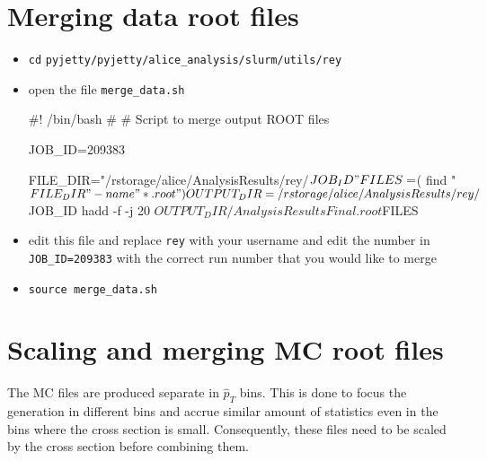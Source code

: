 \documentclass[12pt]{article}
\begin{document}
\section{Merging data root files}

\begin{itemize}
\item \verb|cd| \verb|pyjetty/pyjetty/alice_analysis/slurm/utils/rey|
\item open the file \verb|merge_data.sh|

\begin{tcolorbox}
\begin{verbnobox}[\scriptsize]
#! /bin/bash
#
# Script to merge output ROOT files

JOB_ID=209383

FILE_DIR="/rstorage/alice/AnalysisResults/rey/$JOB_ID"
FILES=$( find "$FILE_DIR" -name "*.root" )

OUTPUT_DIR=/rstorage/alice/AnalysisResults/rey/$JOB_ID
hadd -f -j 20 $OUTPUT_DIR/AnalysisResultsFinal.root $FILES
\end{verbnobox}  
\end{tcolorbox}

\item edit this file and replace \verb|rey| with your username and edit the number in \verb|JOB_ID=209383| with the correct run number that you would like to merge
\item \verb|source merge_data.sh|
\end{itemize}

\section{Scaling and merging MC root files}
\label{sec:scale_merge}

The MC files are produced separate in $\hat{p}_T$ bins. This is done to focus the generation in different bins
and accrue similar amount of statistics even in the bins where the cross section is small. Consequently, these files need to be scaled by the cross section
before combining them.
\end{document}
